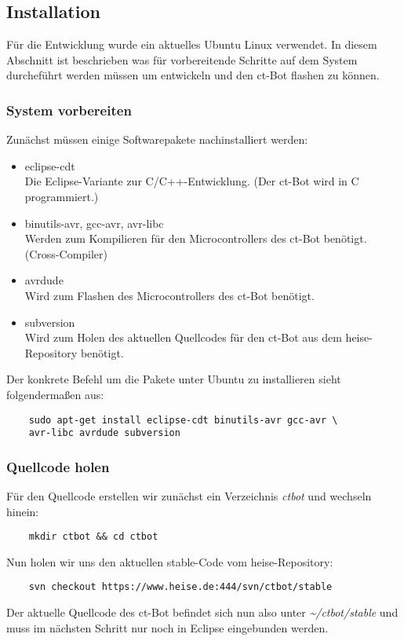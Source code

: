 \subsection{Installation}
Für die Entwicklung wurde ein aktuelles Ubuntu Linux verwendet. In diesem Abschnitt ist beschrieben was für vorbereitende Schritte auf dem System durcheführt werden müssen um entwickeln und den ct-Bot flashen zu können.


\subsubsection{System vorbereiten}
Zunächst müssen einige Softwarepakete nachinstalliert werden:
\begin{itemize}
\item eclipse-cdt\\
Die Eclipse-Variante zur C/C++-Entwicklung. (Der ct-Bot wird in C programmiert.)
\item binutils-avr, gcc-avr, avr-libc\\
Werden zum Kompilieren für den Microcontrollers des ct-Bot benötigt. (Cross-Compiler)
\item avrdude\\
Wird zum Flashen des Microcontrollers des ct-Bot benötigt.
\item subversion\\
Wird zum Holen des aktuellen Quellcodes für den ct-Bot aus dem heise-Repository benötigt.
\end{itemize}
Der konkrete Befehl um die Pakete unter Ubuntu zu installieren sieht folgendermaßen aus:
\begin{lstlisting}
	sudo apt-get install eclipse-cdt binutils-avr gcc-avr \
	avr-libc avrdude subversion
\end{lstlisting}


\subsubsection{Quellcode holen}
Für den Quellcode erstellen wir zunächst ein Verzeichnis \textit{ctbot} und wechseln hinein:
\begin{lstlisting}
	mkdir ctbot && cd ctbot
\end{lstlisting}
Nun holen wir uns den aktuellen stable-Code vom heise-Repository:
\begin{lstlisting}
	svn checkout https://www.heise.de:444/svn/ctbot/stable
\end{lstlisting}
Der aktuelle Quellcode des ct-Bot befindet sich nun also unter \textit{\~{}/ctbot/stable} und muss im nächsten Schritt nur noch in Eclipse eingebunden werden.


